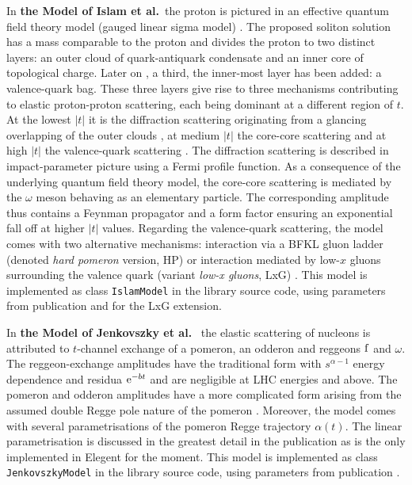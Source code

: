 \documentclass[preprint,12pt]{elsarticle}
\def\class#1{{\tt #1}}
\def\e{{\rm e}}
\begin{document}

 
In {\bf the Model of Islam et al.}~the proton is pictured in an effective quantum field theory model (gauged linear sigma model) \cite{islam06}. The proposed soliton solution has a mass comparable to the proton and divides the proton to two distinct layers: an outer cloud of quark-antiquark condensate and an inner core of topological charge. Later on \cite{islam05}, a third, the inner-most layer has been added: a valence-quark bag. These three layers give rise to three mechanisms contributing to elastic proton-proton scattering, each being dominant at a different region of $t$. At the lowest $|t|$ it is the diffraction scattering originating from a glancing overlapping of the outer clouds \cite{islam84,islam87}, at medium $|t|$ the core-core scattering \cite{islam06} and at high $|t|$ the valence-quark scattering \cite{islam05,islam09}. The diffraction scattering is described in impact-parameter picture using a Fermi profile function. As a consequence of the underlying quantum field theory model, the core-core scattering is mediated by the $\omega$ meson behaving as an elementary particle. The corresponding amplitude thus contains a Feynman propagator and a form factor ensuring an exponential fall off at higher $|t|$ values. Regarding the valence-quark scattering, the model comes with two alternative mechanisms: interaction via a BFKL gluon ladder (denoted {\em hard pomeron} version, HP) \cite{islam05} or interaction mediated by low-$x$ gluons surrounding the valence quark (variant {\em low-x gluons}, LxG) \cite{islam09}. This model is implemented as class \class{IslamModel} in the library source code, using parameters from publication \cite{islam06} and \cite{islam09} for the LxG extension.


In {\bf the Model of Jenkovszky et al.}~\cite{jenkovszky11} the elastic scattering of nucleons is attributed to $t$-channel exchange of a pomeron, an odderon and reggeons $\rm f$ and $\omega$. The reggeon-exchange amplitudes have the traditional form with $s^{\alpha - 1}$ energy dependence and residua $\e^{-bt}$ and are negligible at LHC energies and above. The pomeron and odderon amplitudes have a more complicated form arising from the assumed double Regge pole nature of the pomeron \cite[section 2]{jenkovszky86}. Moreover, the model comes with several parametrisations of the pomeron Regge trajectory $\alpha(t)$. The linear parametrisation is discussed in the greatest detail in the publication as is the only implemented in Elegent for the moment. This model is implemented as class \class{JenkovszkyModel} in the library source code, using parameters from publication \cite{jenkovszky11}.
\end{document}
